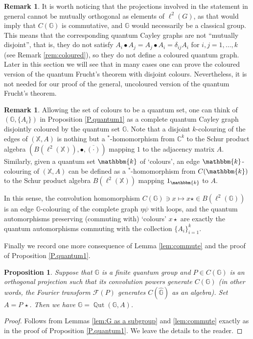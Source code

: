 \documentclass[12pt]{amsart}
\newtheorem{prop}[thm]{Proposition}
\theoremstyle{definition}
\theoremstyle{definition}
\theoremstyle{definition}
\theoremstyle{definition}
\newtheorem{remark}[thm]{Remark}
\DeclareMathOperator{\Qut}{\mathbb{Q}ut}
\newcommand{\G}{\mathbb{G}}
\newcommand{\X}{\mathbb{X}}
\newcommand{\C}{\mathbb{C}}
\newcommand{\ol}[1]{\overline{#1}}
\numberwithin{equation}{section}
\begin{document}
\begin{remark}
    It is worth noticing that the projections involved in the statement in general cannot be mutually orthogonal as elements of $\ell^2(G)$, as that would imply that  $C(\G)$ is commutative, and $\G$ would necessarily be a classical group. This means that the corresponding quantum Cayley graphs are not ``mutually disjoint'', that is, they do not satisfy $A_{i}\bullet A_{j}=A_{j}\bullet A_{i}=\delta_{ij} A_{i}$ for $i, j=1, \ldots, k$ (see Remark \ref{rem:coloured}), so they do not define a coloured quantum graph. %
    Later in this section we will see that in many cases one can prove the coloured version of the quantum Frucht's theorem with disjoint colours. Nevertheless, it is not needed for our proof of the general, uncoloured version of the quantum Frucht's theorem. 
\end{remark}

\begin{remark}
    Allowing the set of colours to be a quantum set, one can think of $(\G,\{A_i\})$ in Proposition \ref{P.quantum1} as a complete quantum Cayley graph disjointly coloured by the quantum set $\G$. 
    Note that a disjoint $k$-colouring of the edges of $(\X,A)$ is nothing but a $^*$-homomorphism from $\C^k$ to the Schur product algebra $(B(\ell^2(\X)),\bullet,\ol{(\cdot)})$ mapping $1$ to the adjacency matrix $A$.
    Similarly, given a quantum set $\mathbbm{k}$ of `colours', an edge $\mathbbm{k}$-colouring of $(\X,A)$ can be defined as a $^*$-homomorphism from $C(\mathbbm{k})$ to the Schur product algebra $B(\ell^2(\X))$ mapping $1_\mathbbm{k}$ to $A$.

    In this sense, the convolution homomorphism $C(\G) \ni x \mapsto x\star \in B(\ell^2(\G))$ is an edge $\G$-colouring of the complete graph $\eta \psi$ with loops, and the quantum automorphisms preserving (commuting with) `colours' $x\star$ are exactly the quantum automorphisms commuting with the collection $\{A_i\}_{i=1}^k$.
\end{remark}

Finally we record one more consequence of Lemma \ref{lem:commute} and the proof of Proposition \ref{P.quantum1}.

\begin{prop} \label{prop:fullalgebra}
   Suppose that $\G$ is a finite quantum group and $P \in C(\G)$ is an orthogonal projection such that its convolution powers generate $C(\G)$ (in other words, the Fourier transform $\mathcal{F}(P)$ generates $C(\widehat{\G})$ as an algebra). Set $A=P \, \star$. Then we have  
   $\G = \Qut(\G, A)$.
\end{prop}
\begin{proof}
    Follows from Lemmas \ref{lem:G as a subgroup} and \ref{lem:commute} exactly as in the proof of Proposition \ref{P.quantum1}. We leave the details to the reader.
\end{proof}
\end{document}
